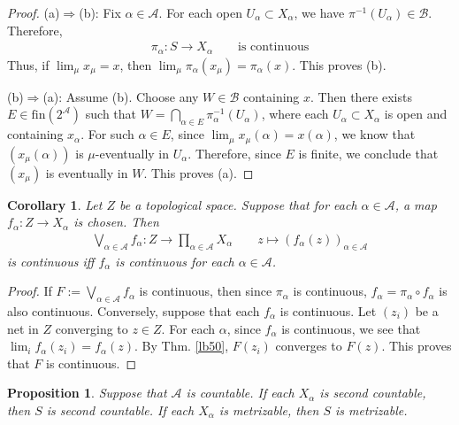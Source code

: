 \documentclass[12pt,b5paper,notitlepage]{article}
\theoremstyle{definition}
\theoremstyle{plain}
\newtheorem{pp}[df]{Proposition}
\newtheorem{co}[df]{Corollary}
\newcommand{\mc}{\mathcal}
\newcommand{\scr}{\mathscr}
\newcommand{\fin}{\mathrm{fin}}
\newcommand{\MB}{\mathcal B}
\numberwithin{equation}{section}
\begin{document}
\begin{proof}
(a)$\Rightarrow$(b): Fix $\alpha\in\scr A$. For each open $U_\alpha\subset X_\alpha$, we have $\pi^{-1}(U_\alpha)\in\mc B$. Therefore,
\begin{align}
\pi_\alpha:S\rightarrow X_\alpha\qquad\text{is continuous}
\end{align}
Thus, if $\lim_\mu x_\mu=x$, then $\lim_\mu \pi_\alpha(x_\mu)=\pi_\alpha(x)$. This proves (b).

(b)$\Rightarrow$(a): Assume (b). Choose any $W\in\MB$ containing $x$. Then there exists $E\in\fin(2^{\scr A})$ such that $W=\bigcap_{\alpha\in E}\pi_\alpha^{-1}(U_\alpha)$, where each $U_\alpha\subset X_\alpha$ is open and containing $x_\alpha$. For such $\alpha\in E$, since $\lim_\mu x_\mu(\alpha)=x(\alpha)$, we know that $(x_\mu(\alpha))$ is $\mu$-eventually in $U_\alpha$. Therefore, since $E$ is finite, we conclude that $(x_\mu)$ is eventually in $W$. This proves (a).
\end{proof}

\begin{co}\label{lb55}
Let $Z$ be a topological space. Suppose that for each $\alpha\in\scr A$, a map $f_\alpha:Z\rightarrow X_\alpha$  is chosen. Then \index{zz@$\bigvee_{\alpha\in\scr A}f_\alpha$}
\begin{gather}
\bigvee_{\alpha\in\scr A}f_\alpha:Z\rightarrow\prod_{\alpha\in\scr A}X_\alpha\qquad z\mapsto (f_\alpha(z))_{\alpha\in\scr A}
\end{gather}
is continuous iff $f_\alpha$ is continuous for each $\alpha\in\scr A$.
\end{co}

\begin{proof}
If $F:=\bigvee_{\alpha\in\scr A}f_\alpha$ is continuous, then since $\pi_\alpha$ is continuous, $f_\alpha=\pi_\alpha\circ f_\alpha$ is also continuous. Conversely, suppose that each $f_\alpha$ is continuous. Let $(z_i)$ be a net in $Z$ converging to $z\in Z$. For each $\alpha$, since $f_\alpha$ is continuous, we see that $\lim_if_\alpha(z_i)=f_\alpha(z)$. By Thm. \ref{lb50}, $F(z_i)$ converges to $F(z)$. This proves that $F$ is continuous.
\end{proof}




\begin{pp}\label{lb51}
Suppose that $\scr A$ is countable. If each $X_\alpha$ is second countable, then $S$ is second countable. If each $X_\alpha$ is metrizable, then $S$ is metrizable.
\end{pp}
\end{document}
